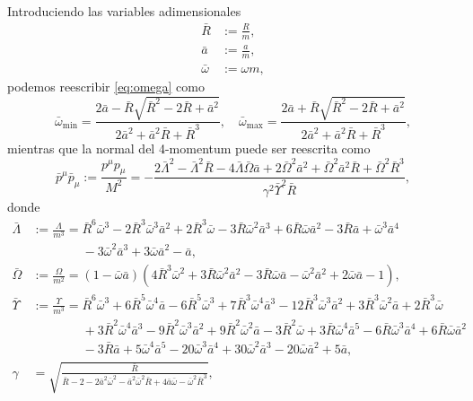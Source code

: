 Introduciendo las variables adimensionales 
\begin{align}
\bar{R} &:= \frac{R}{m},\\
\bar{a} &:= \frac{a}{m},\\
\bar{\omega} &:= \omega m,
\end{align}
podemos reescribir \eqref{eq:omega} como
\begin{equation}
\bar{\omega}_{\mathrm{min}} = \frac{2 \bar{a} - \bar{R} \sqrt{\bar{R}^{2} - 2 \bar{R} + \bar{a}^{2}}}{2 \bar{a}^{2} + \bar{a}^{2} \bar{R} + \bar{R}^{3}},
\quad 
\bar{\omega}_{\mathrm{max}} = \frac{2 \bar{a} + \bar{R} \sqrt{\bar{R}^{2} - 2 \bar{R} + \bar{a}^{2}}}{2 \bar{a}^{2} + \bar{a}^{2} \bar{R} + \bar{R}^{3}},
\end{equation}
mientras que la normal del 4-momentum puede ser reescrita como
\begin{equation}
\label{ppadimentional}
\bar{p}^{\mu} \bar{p}_{\mu} := \frac{p^{\mu} p_{\mu}}{M^2} = - \frac{2 \bar{\Lambda}^{2} - \bar{\Lambda}^{2} \bar{R} - 4 \bar{\Lambda} \bar{\Omega} \bar{a} + 2 \bar{\Omega}^{2} \bar{a}^{2} + \bar{\Omega}^{2} \bar{a}^{2} \bar{R} + \bar{\Omega}^{2} \bar{R}^{3}}{\gamma^{2} \bar{\Upsilon}^{2} \bar{R}},
\end{equation}
donde
\begin{align}
\bar{\Lambda} &:= \frac{\Lambda}{m^3} = \bar{R}^{6} \bar{\omega}^{3} - 2 \bar{R}^{3} \bar{\omega}^{3} \bar{a}^{2} + 2 \bar{R}^{3} \bar{\omega} - 3 \bar{R} \bar{\omega}^{2} \bar{a}^{3} + 6 \bar{R} \bar{\omega} \bar{a}^{2} - 3 \bar{R} \bar{a} + \bar{\omega}^{3} \bar{a}^{4} \nonumber \\
& \qquad \qquad  - 3 \bar{\omega}^{2} \bar{a}^{3} + 3 \bar{\omega} \bar{a}^{2} - \bar{a},\\
\bar{\Omega} &:=  \frac{\Omega}{m^2} = \left(1 - \bar{\omega} \bar{a} \right) \left(4 \bar{R}^{3} \bar{\omega}^{2} + 3 \bar{R} \bar{\omega}^{2} \bar{a}^{2} - 3 \bar{R} \bar{\omega} \bar{a} - \bar{\omega}^{2} \bar{a}^{2} + 2 \bar{\omega} \bar{a} - 1\right),\\
\bar{\Upsilon} &:= \frac{\Upsilon}{m^3} = \bar{R}^{6} \bar{\omega}^{3} + 6 \bar{R}^{5} \bar{\omega}^{4} \bar{a} - 6 \bar{R}^{5} \bar{\omega}^{3} + 7 \bar{R}^{3} \bar{\omega}^{4} \bar{a}^{3} - 12 \bar{R}^{3} \bar{\omega}^{3} \bar{a}^{2} + 3 \bar{R}^{3} \bar{\omega}^{2} \bar{a} + 2 \bar{R}^{3} \bar{\omega} 
 \nonumber \\
& \qquad \qquad + 3 \bar{R}^{2} \bar{\omega}^{4} \bar{a}^{3} - 9 \bar{R}^{2} \bar{\omega}^{3} \bar{a}^{2} + 9 \bar{R}^{2} \bar{\omega}^{2} \bar{a} - 3 \bar{R}^{2} \bar{\omega} + 3 \bar{R} \bar{\omega}^{4} \bar{a}^{5} - 6 \bar{R} \bar{\omega}^{3} \bar{a}^{4} + 6 \bar{R} \bar{\omega} \bar{a}^{2} \nonumber\\
& \qquad \qquad - 3 \bar{R} \bar{a} + 5 \bar{\omega}^{4} \bar{a}^{5} - 20 \bar{\omega}^{3} \bar{a}^{4} + 30 \bar{\omega}^{2} \bar{a}^{3} - 20 \bar{\omega} \bar{a}^{2} + 5 \bar{a},\\
\gamma &= \sqrt{ \frac{\bar{R}}{\bar{R} - 2 - 2 \bar{a}^{2}  \bar{\omega}^{2} - \bar{a}^{2} \bar{\omega}^{2} \bar{R} + 4 \bar{a}  \bar{\omega} - \bar{\omega}^{2} \bar{R}^{3}}},
\end{align}

